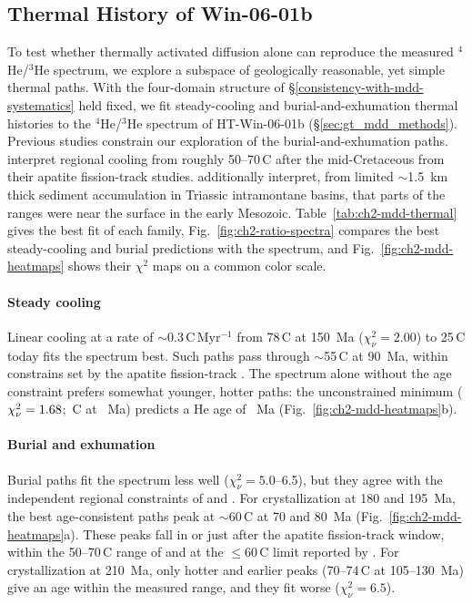 \subsection{Thermal History of Win-06-01b}\label{sec:gt_thermal_history}

To test whether thermally activated diffusion alone can reproduce the measured $^4$He/$^3$He spectrum, 
we explore a subspace of geologically reasonable, yet simple thermal paths. With the four-domain structure of
\S\ref{consistency-with-mdd-systematics} held fixed, we fit steady-cooling and
burial-and-exhumation thermal histories to the $^4$He/$^3$He spectrum of HT-Win-06-01b
(\S\ref{sec:gt_mdd_methods}). Previous studies constrain our exploration of the burial-and-exhumation paths. 
\citet{gibsonstuwe2000,mitchell1998} interpret regional cooling 
from roughly 50--70\,\textdegree C after the mid-Cretaceous from their apatite
fission-track studies. \citet{mitchell1998} additionally interpret, from limited $\sim$1.5~km thick sediment accumulation 
in Triassic intramontane basins, that parts of the ranges were near the surface in the early
Mesozoic.  Table~\ref{tab:ch2-mdd-thermal} gives the best fit of each
family, Fig.~\ref{fig:ch2-ratio-spectra} compares the best steady-cooling and burial
predictions with the spectrum, and Fig.~\ref{fig:ch2-mdd-heatmaps} shows their $\chi^2$ maps on a
common color scale.

\paragraph{Steady cooling} Linear cooling at a rate of $\sim$0.3\,\textdegree C\,Myr$^{-1}$ 
from 78\,\textdegree C at 150~Ma ($\chi^2_\nu=2.00$) to 25\,\textdegree C 
today fits the spectrum best. Such paths pass through
$\sim$55\,\textdegree C at 90~Ma, within constrains set by the apatite fission-track \citep{gibsonstuwe2000,mitchell1998}. 
The spectrum alone without the age constraint prefers somewhat younger, hotter paths: the unconstrained minimum
($\chi^2_\nu=1.68$; \MDDLinGlobalT\,\textdegree C at \MDDLinGlobalTform~Ma) predicts
a He age of \MDDLinGlobalAge~Ma (Fig.~\ref{fig:ch2-mdd-heatmaps}b). 

\paragraph{Burial and exhumation} Burial paths fit the spectrum less well
($\chi^2_\nu=5.0$--6.5), but they agree with the independent regional constraints of \citet{gibsonstuwe2000} and \citet{mitchell1998}. For
crystallization at 180 and 195~Ma, the best age-consistent paths peak at $\sim$60\,\textdegree C at
70 and 80~Ma (Fig.~\ref{fig:ch2-mdd-heatmaps}a). These peaks fall in or just after the apatite
fission-track window, within the 50--70\,\textdegree C range of \citet{gibsonstuwe2000} and at
the $\leq$60\,\textdegree C limit reported by \citet{mitchell1998}. For crystallization at
210~Ma, only hotter and earlier peaks (70--74\,\textdegree C at 105--130~Ma) give an age within
the measured range, and they fit worse ($\chi^2_\nu=6.5$).

